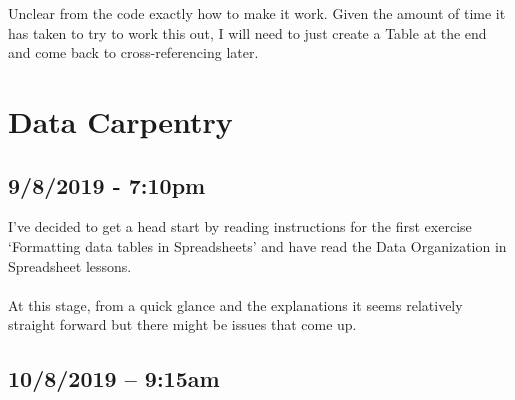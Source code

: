 \documentclass{article}
\begin{document}
Unclear from the code exactly how to make it work. Given the amount of time it has taken to try to work this out, I will need to just create a Table at the end and come back to cross-referencing later.


\newpage
\section{Data Carpentry}
\subsection*{9/8/2019 - 7:10pm}
I’ve decided to get a head start by reading instructions for the first exercise ‘Formatting data tables in Spreadsheets’ and have read the Data Organization in Spreadsheet lessons.\\
\\
At this stage, from a quick glance and the explanations it seems relatively straight forward but there might be issues that come up.\par
\subsection*{10/8/2019 – 9:15am}
\end{document}
